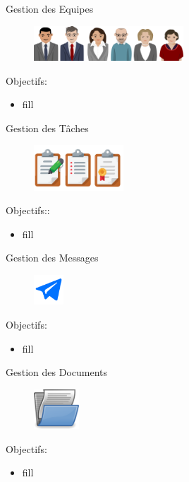 \begin{frame}{Gestion des Equipes}
\begin{figure}[h!]
  \includegraphics[width=0.5\textwidth]{images/team}
\end{figure}
Objectifs:
  \begin{itemize}
\item fill
    \end{itemize}
\end{frame}

\begin{frame}{Gestion des Tâches}
\begin{figure}[h!]
  \includegraphics[width=0.3\textwidth]{images/tasks}
\end{figure}
Objectifs::
  \begin{itemize}
\item fill
    \end{itemize}
\end{frame}

\begin{frame}{Gestion des Messages}
\begin{figure}[h!]
  \includegraphics[width=0.10\textwidth]{images/-59-512}
\end{figure}
Objectifs:
  \begin{itemize}
\item fill
    \end{itemize}
\end{frame}

\begin{frame}{Gestion des Documents}
\begin{figure}[h!]
  \includegraphics[width=0.15\textwidth]{images/document-open-hi}
\end{figure}
Objectifs:
  \begin{itemize}
\item fill
    \end{itemize}
\end{frame}


